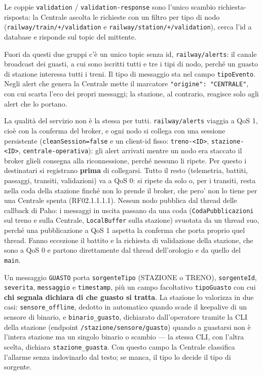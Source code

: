 \documentclass[11pt]{article}
\begin{document}
Le coppie \texttt{validation} / \texttt{validation-response} sono l'unico scambio richiesta-risposta: la
Centrale ascolta le richieste con un filtro per tipo di nodo (\texttt{railway/train/+/validation} e
\texttt{railway/station/+/validation}), cerca l'id a database e risponde sul topic del mittente.

Fuori da questi due gruppi c'è un unico topic senza id, \texttt{railway/alerts}: il canale broadcast dei
guasti, a cui sono iscritti tutti e tre i tipi di nodo, perché un guasto di stazione interessa
tutti i treni. Il tipo di messaggio sta nel campo \texttt{tipoEvento}. Negli alert che genera la Centrale
mette il marcatore \texttt{"origine": "CENTRALE"}, con cui scarta l'eco dei propri messaggi; la stazione,
al contrario, reagisce solo agli alert che lo portano.

La qualità del servizio non è la stessa per tutti. \texttt{railway/alerts} viaggia a QoS 1, cioè con la
conferma del broker, e ogni nodo si collega con una sessione persistente (\texttt{cleanSession=false} e un
client-id fisso: \texttt{treno-<ID>}, \texttt{stazione-<ID>}, \texttt{centrale-operativa}): gli alert arrivati mentre un
nodo era staccato il broker glieli consegna alla riconnessione, perché nessuno li ripete. Per
questo i destinatari si registrano \textbf{prima} di collegarsi. Tutto il resto (telemetria, battiti,
passaggi, transiti, validazioni) va a QoS 0: si ripete da solo o, per i transiti, resta nella coda
della stazione finché non lo prende il broker, che pero' non lo tiene per una Centrale spenta
(RF02.1.1.1.1). Nessun nodo pubblica dal thread delle callback di Paho: i messaggi in uscita passano
da una coda (\texttt{CodaPubblicazioni} sul treno e sulla Centrale, \texttt{LocalBuffer} sulla stazione) svuotata
da un thread suo, perché una pubblicazione a QoS 1 aspetta la conferma che porta proprio quel
thread. Fanno eccezione il battito e la richiesta di validazione della stazione, che sono a QoS 0 e
partono direttamente dal thread dell'orologio e da quello del \texttt{main}.

Un messaggio \texttt{GUASTO} porta \texttt{sorgenteTipo} (STAZIONE o TRENO), \texttt{sorgenteId}, \texttt{severita},
\texttt{messaggio} e \texttt{timestamp}, più un campo facoltativo \texttt{tipoGuasto} con cui \textbf{chi segnala dichiara di
che guasto si tratta}. La stazione lo valorizza in due casi: \texttt{sensore\_offline}, dedotto in
automatico quando scade il keepalive di un sensore di binario, e \texttt{binario\_guasto}, dichiarato
dall'operatore tramite la CLI della stazione (endpoint \texttt{/stazione/sensore/guasto}) quando a
guastarsi non è l'intera stazione ma un singolo binario o scambio — la stessa CLI, con
l'altra scelta, dichiara \texttt{stazione\_guasta}. Con questo campo la Centrale classifica l'allarme senza
indovinarlo dal testo; se manca, il tipo lo decide il tipo di sorgente.
\end{document}
